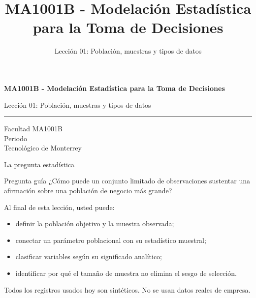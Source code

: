 \documentclass[aspectratio=169,10pt,spanish]{beamer}
\title{MA1001B - Modelación Estadística para la Toma de Decisiones}
\subtitle{Lección 01: Población, muestras y tipos de datos}
\author{}
\institute{Tecnol\'ogico de Monterrey}
\date{}
\begin{document}
\begin{frame}[plain]
  \vspace{1.2cm}
  {\Large\bfseries MA1001B - Modelación Estadística para la Toma de Decisiones\par}
  \vspace{0.7cm}
  {\large Lección 01: Población, muestras y tipos de datos\par}
  \vspace{0.7cm}
  {\color{TecRojo}\rule{\textwidth}{1.2pt}}
  \vspace{0.8cm}

  Facultad MA1001B\\[0.3cm]
  Periodo\\[0.3cm]
  Tecnol\'ogico de Monterrey
\end{frame}

\begin{frame}{La pregunta estadística}
  \begin{alertblock}{Pregunta guía}
    ¿Cómo puede un conjunto limitado de observaciones sustentar una afirmación
    sobre una población de negocio más grande?
  \end{alertblock}

  \vspace{0.6em}
  Al final de esta lección, usted puede:
  \begin{itemize}
    \item definir la población objetivo y la muestra observada;
    \item conectar un parámetro poblacional con su estadístico muestral;
    \item clasificar variables según su significado analítico;
    \item identificar por qué el tamaño de muestra no elimina el sesgo de selección.
  \end{itemize}

  \vfill
  \scriptsize Todos los registros usados hoy son sintéticos. No se usan datos reales de empresa.
\end{frame}
\end{document}
